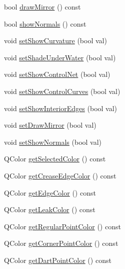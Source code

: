 \begin{DoxyCompactItemize}
bool \hyperlink{classShipCAD_1_1SubdivisionSurface_a42b3e7703acd8d51c501d7c47f09ed78}{draw\+Mirror} () const 
\item 
bool \hyperlink{classShipCAD_1_1SubdivisionSurface_aa0927937f7d321e9d564c04884b2ce54}{show\+Normals} () const 
\item 
void \hyperlink{classShipCAD_1_1SubdivisionSurface_abf6fe62614aadf1cdd4f26fb4d3fc441}{set\+Show\+Curvature} (bool val)
\item 
void \hyperlink{classShipCAD_1_1SubdivisionSurface_a797d9b728f794b7f2fc61f1c51dacc06}{set\+Shade\+Under\+Water} (bool val)
\item 
void \hyperlink{classShipCAD_1_1SubdivisionSurface_af5380f1a7932b23a5fbf400c85542381}{set\+Show\+Control\+Net} (bool val)
\item 
void \hyperlink{classShipCAD_1_1SubdivisionSurface_aabf54bc152176697a82c0eb6e47f5981}{set\+Show\+Control\+Curves} (bool val)
\item 
void \hyperlink{classShipCAD_1_1SubdivisionSurface_a5a4e5acd1bfc4d845d28513dd2dbc0cd}{set\+Show\+Interior\+Edges} (bool val)
\item 
void \hyperlink{classShipCAD_1_1SubdivisionSurface_a3605a409a102a18714e9ad7d028e7f33}{set\+Draw\+Mirror} (bool val)
\item 
void \hyperlink{classShipCAD_1_1SubdivisionSurface_a678530145785bd366316b35d2bd0ab67}{set\+Show\+Normals} (bool val)
\item 
Q\+Color \hyperlink{classShipCAD_1_1SubdivisionSurface_a1fb4babaa91950e02f5e7546ed2c1e5b}{get\+Selected\+Color} () const 
\item 
Q\+Color \hyperlink{classShipCAD_1_1SubdivisionSurface_a691650cdaa3bb201de7c16b8ac05e496}{get\+Crease\+Edge\+Color} () const 
\item 
Q\+Color \hyperlink{classShipCAD_1_1SubdivisionSurface_a6c0a87fa795f04066ca3694242a128ba}{get\+Edge\+Color} () const 
\item 
Q\+Color \hyperlink{classShipCAD_1_1SubdivisionSurface_adb2c51cef076b9d25f09ae1faf0ee043}{get\+Leak\+Color} () const 
\item 
Q\+Color \hyperlink{classShipCAD_1_1SubdivisionSurface_ac76ab946bfcba98fc7f0f8eebce43c3d}{get\+Regular\+Point\+Color} () const 
\item 
Q\+Color \hyperlink{classShipCAD_1_1SubdivisionSurface_a124cff1219d67705272458a29eefefe5}{get\+Corner\+Point\+Color} () const 
\item 
Q\+Color \hyperlink{classShipCAD_1_1SubdivisionSurface_a991d789d40dc254caadaaf22d5343963}{get\+Dart\+Point\+Color} () const 

\end{DoxyCompactItemize}
